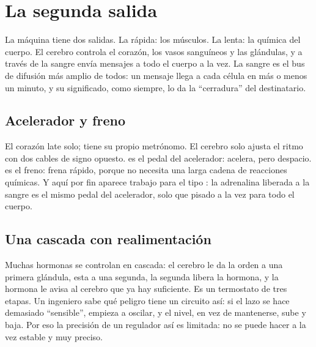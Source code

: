\chapter{La segunda salida}

La máquina tiene dos salidas. La rápida: los músculos. La lenta: la química del cuerpo. El cerebro controla el corazón, los vasos sanguíneos y las glándulas, y a través de la sangre envía mensajes a todo el cuerpo a la vez. La sangre es el bus de difusión más amplio de todos: un mensaje llega a cada célula en más o menos un minuto, y su significado, como siempre, lo da la “cerradura” del destinatario.

\section*{Acelerador y freno}

El corazón late solo; tiene su propio metrónomo. El cerebro solo ajusta el ritmo con dos cables de signo opuesto.  es el pedal del acelerador: acelera, pero despacio.  es el freno: frena rápido, porque no necesita una larga cadena de reacciones químicas. Y aquí por fin aparece trabajo para el tipo : la adrenalina liberada a la sangre es el mismo pedal del acelerador, solo que pisado a la vez para todo el cuerpo.


\section*{Una cascada con realimentación}

Muchas hormonas se controlan en cascada: el cerebro le da la orden a una primera glándula, esta a una segunda, la segunda libera la hormona, y la hormona le avisa al cerebro que ya hay suficiente. Es un termostato de tres etapas. Un ingeniero sabe qué peligro tiene un circuito así: si el lazo se hace demasiado “sensible”, empieza a oscilar, y el nivel, en vez de mantenerse, sube y baja. Por eso la precisión de un regulador así es limitada: no se puede hacer a la vez estable y muy preciso.

